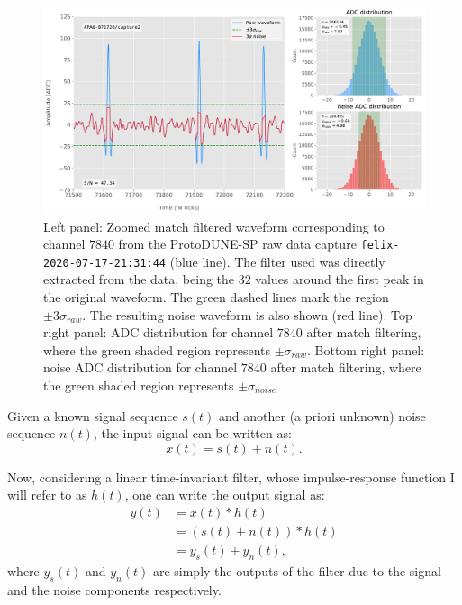 \begin{figure}[t]
	\centering
	\includegraphics[width=1\linewidth]{Images/Matched_Filter/waveform_example_mf}
	\caption[Example matched filtered waveform from a ProtoDUNE-SP raw data capture.]{Left panel: Zoomed match filtered waveform corresponding to channel $7840$ from the ProtoDUNE-SP raw data capture \texttt{felix-2020-07-17-21:31:44} (blue line). The filter used was directly extracted from the data, being the $32$ values around the first peak in the original waveform. The green dashed lines mark the region $\pm3\sigma_{raw}$. The resulting noise waveform is also shown (red line). Top right panel: ADC distribution for channel $7840$ after match filtering, where the green shaded region represents $\pm \sigma_{raw}$. Bottom right panel: noise ADC distribution for channel $7840$ after match filtering, where the green shaded region represents $\pm \sigma_{noise}$}
	\label{fig:adcs_mf}
\end{figure}

Given a known signal sequence $s(t)$ and another (a priori unknown) noise sequence $n(t)$, the input signal can be written as:
\begin{equation}\label{2.4.1}
	x(t) = s(t) + n(t).
\end{equation}

Now, considering a linear time-invariant filter, whose impulse-response function I will refer to as $h(t)$, one can write the output signal as:
\begin{equation}\label{2.4.2}
	\begin{split}
		y(t) &= x(t)*h(t)\\
		&= \left(s(t) + n(t)\right)*h(t)\\
		&= y_{s}(t) + y_{n}(t),
	\end{split}
\end{equation}
where $y_{s}(t)$ and $y_{n}(t)$ are simply the outputs of the filter due to the signal and the noise components respectively.

